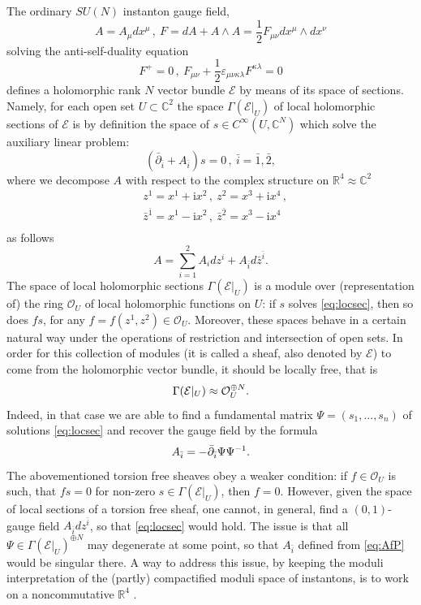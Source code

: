 \documentclass[12pt]{article}
\numberwithin{equation}{section}
\newcommand{\ve}{{\varepsilon}}
\newcommand\beq{\begin{equation}}
\newcommand\eeq{\end{equation}}
\theoremstyle{definition}
\newcommand {\BC}   {\mathbb C}
\newcommand {\BR}   {\mathbb R}
\newcommand {\CalE} {\mathcal E}
\newcommand {\CalO} {\mathcal O}
\newcommand {\zb} {{\bar z}}
\newcommand {\ii} {\mathrm{i}}
\begin{document}
The ordinary $SU(N)$ instanton gauge field, 
\beq
A = A_{\mu} dx^{\mu} \, , \ F = dA + A \wedge A = \frac 12 F_{\mu\nu} dx^{\mu} \wedge dx^{\nu}
\eeq
solving the anti-self-duality equation
\beq
F^{+} = 0\, , \ F_{\mu\nu} + \frac 12 {\ve}_{\mu\nu\kappa\lambda} F^{\kappa\lambda} = 0
\eeq
defines a holomorphic rank $N$ vector bundle $\CalE$ by means of its space of sections. Namely, for each open set $U \subset \mathbb{C}^2$ the space $\Gamma({\CalE}\vert_{U})$ of local holomorphic sections of $\CalE$
is by definition the space of $s \in C^{\infty}(U, \mathbb{C}^N)$ which solve the auxiliary linear problem:
\beq
 \left( {\bar\partial}_{\bar i} + A_{\bar i} \right) s = 0\, , \ {\bar i} = {\bar 1}, {\bar 2}, 
\label{eq:locsec}
\eeq
where we decompose $A$ with respect to the complex structure on ${\BR}^{4} \approx {\BC}^{2}$
\beq
\begin{aligned}
& z^{1} = x^{1} + {\ii} x^{2}\, , \ z^{2} = x^{3} + {\ii} x^{4}\, , \\
& {\zb}^{\bar 1} = x^{1} - {\ii} x^{2} \, , \ {\zb}^{\bar 2} = x^{3} - {\ii} x^{4} \\
\end{aligned}
\eeq
as follows
\beq
A = \sum_{i=1}^{2} A_{i} dz^{i} + A_{\bar i} d{\bar z}^{\bar i}.
\eeq
The space of local holomorphic sections ${\Gamma}({\CalE}\vert_{U})$ is a module over (representation of) the ring ${\CalO}_{U}$ of local holomorphic functions on $U$: if $s$ solves \eqref{eq:locsec}, then so does $f s$, for any $f = f(z^1, z^2) \in {\CalO}_{U}$. Moreover, these spaces behave in a certain natural way under the operations of restriction and intersection of open sets. In order for this collection of modules (it is called a sheaf, also denoted by $\CalE$) to come from the holomorphic vector bundle, it should be locally free, that is
\beq
{\Gamma}({\CalE}\vert_{U}) \approx 
 \begingroup
{\CalO}_{U}^{\oplus N}. 
\endgroup
\eeq
Indeed, in that case we are able to find a fundamental matrix $\Psi = (s_1, ..., s_n)$ of solutions \eqref{eq:locsec} and recover the gauge field by the formula
\beq\label{eq:AfP}
\begingroup
A_{\bar i} = -\bar{\partial}_{\bar i} \Psi \Psi^{-1}.
\endgroup
\eeq
The abovementioned torsion free sheaves obey a weaker condition: 
if $f \in {\CalO}_{U}$ is such, that $f s = 0$ for non-zero $s \in {\Gamma}({\CalE}\vert_{U})$, 
then $f = 0$. However, given the space of local sections of a torsion free sheaf, one cannot, in general, find a $(0,1)$-gauge field $A_{\bar i}dz^{\bar i}$, so that \eqref{eq:locsec} would hold. The issue is that all $\Psi \in {\Gamma}({\CalE}|_{U})^{\oplus N}$ may degenerate at some point, so that
$A_{\bar i}$ defined from \eqref{eq:AfP} would be singular there. A way to address this issue, by keeping the moduli interpretation of the (partly) compactified moduli space of instantons, is to work on a noncommutative ${\BR}^{4}$ \cite{Nekrasov:1998ss}. 
\end{document}
